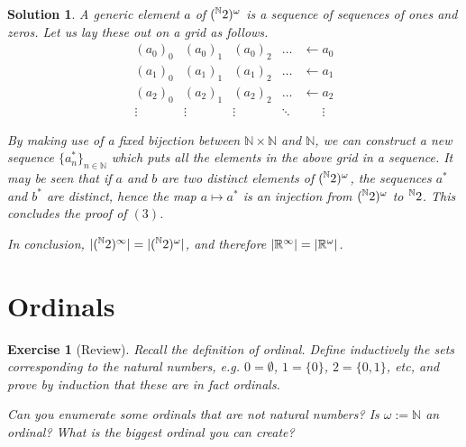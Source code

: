 \documentclass{article}
\newtheorem{ex}{Exercise}
\theoremstyle{nonumberplain}
\newtheorem{sol}{Solution}
\newcommand{\R}{\mathbb{R}}
\newcommand{\N}{\mathbb{N}}
\DeclarePairedDelimiter{\abs}{\lvert}{\rvert}
\begin{document}
\begin{sol}
A generic element $a$ of $(\prescript{\N}{}2)^\omega$ is a sequence of sequences of ones and zeros. Let us lay these out on a grid as follows.
\begin{equation}
\begin{matrix}
(a_0)_0 & (a_0)_1 & (a_0)_2 & \dots & \leftarrow a_0\\
(a_1)_0 & (a_1)_1 & (a_1)_2 & \dots & \leftarrow a_1\\
(a_2)_0 & (a_2)_1 & (a_2)_2 & \dots & \leftarrow a_2\\
\vdots & \vdots & \vdots & \ddots & \phantom{\leftarrow}\vdots
\end{matrix}
\end{equation}

By making use of a fixed bijection between $\N \times \N$ and $\N$, we can construct a new sequence $\{a^*_n\}_{n \in \N}$ which puts all the elements in the above grid in a sequence. It may be seen that if $a$ and $b$ are two distinct elements of $(\prescript{\N}{}2)^\omega$, the sequences $a^*$ and $b^*$ are distinct, hence the map $a \mapsto a^*$ is an injection from $(\prescript{\N}{}2)^\omega$ to $\prescript{\N}{}2$. This concludes the proof of $(3)$.

\smallskip

In conclusion, $\abs{(\prescript{\N}{}2)^\infty} = \abs{(\prescript{\N}{}2)^\omega}$, and therefore $\abs{\R^\infty} = \abs{\R^\omega}$.
\end{sol}

\section{Ordinals}

\begin{ex}[Review]
Recall the definition of ordinal. Define inductively the sets corresponding to the natural numbers, e.g. $0 = \emptyset$, $1 = \{0\}$, $2 = \{0,1\}$, etc, and prove by induction that these are in fact ordinals.

Can you enumerate some ordinals that are not natural numbers? Is $\omega := \N$ an ordinal? What is the biggest ordinal you can create?
\end{ex}
\end{document}

